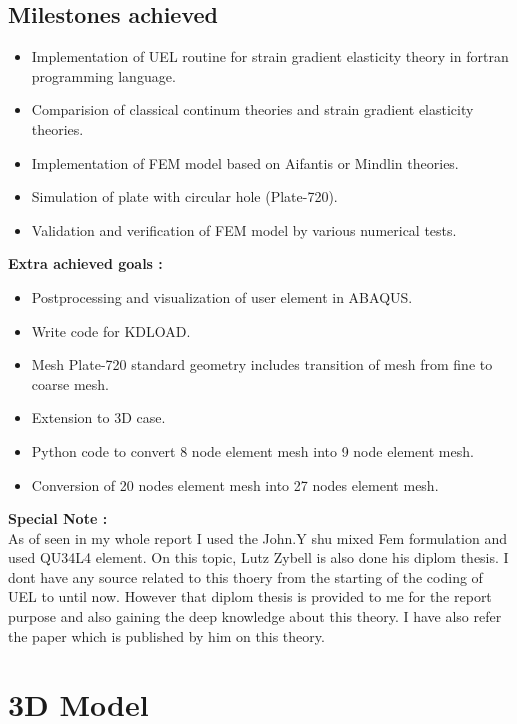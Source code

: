 \documentclass[12pt]{article}
\begin{document}
\subsection{Milestones achieved}
\begin{itemize}
	\item Implementation of UEL routine for strain gradient elasticity theory in fortran programming language.
    \item Comparision of classical continum theories and strain gradient elasticity theories.
    \item Implementation of FEM model based on Aifantis or Mindlin theories.
    \item Simulation of plate with circular hole (Plate-720).
    \item Validation and verification of FEM model by various numerical tests.
\end{itemize}
\textbf{Extra achieved goals :}
\begin{itemize}
	\item Postprocessing and visualization of user element in ABAQUS.
	\item Write code for KDLOAD.
	\item Mesh Plate-720 standard geometry includes transition of mesh from fine to coarse mesh.
	\item Extension to 3D case.
	\item Python code to convert 8 node element mesh into 9 node element mesh.
	\item Conversion of 20 nodes element mesh into 27 nodes element mesh.
\end{itemize}
\vspace{1cm}
\textbf{Special Note :} \\
As of seen in my whole report I used the John.Y shu mixed Fem formulation and used QU34L4 element. On this topic, Lutz Zybell is also done his diplom thesis. I dont have any source related to this thoery from the starting of the coding of UEL to until now. However that diplom thesis is provided to me for the report purpose and also gaining the deep knowledge about this theory. I have also refer the paper which is published by him on this theory.

\newpage

\section{3D Model}
\end{document}
